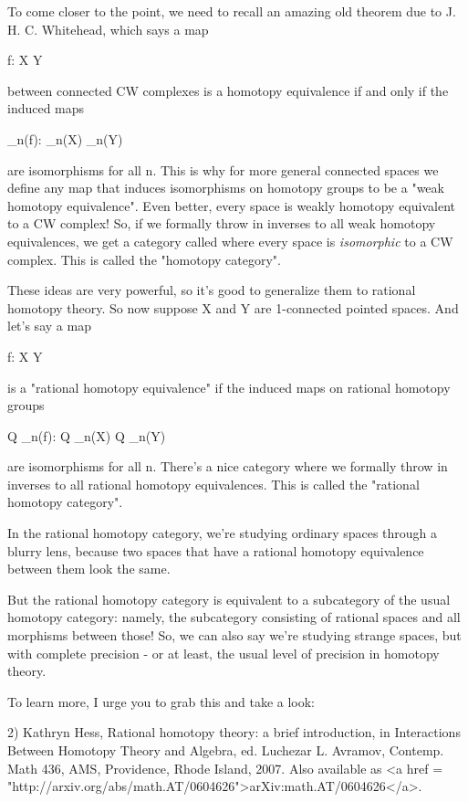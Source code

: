To come closer to the point, we need to recall an amazing old
theorem due to J. H. C. Whitehead, which says a map

f: X \to  Y 

between connected CW complexes is a homotopy equivalence if and only 
if the induced maps

\pi _{n}(f): \pi _{n}(X) \to  \pi _{n}(Y)

are isomorphisms for all n.  This is why for more general connected
spaces we define any map that induces isomorphisms on homotopy groups
to be a "weak homotopy equivalence".  Even better, every space is
weakly homotopy equivalent to a CW complex!  So, if we formally throw
in inverses to all weak homotopy equivalences, we get a category
called where every space is \emph{isomorphic} to a CW complex.  This is
called the "homotopy category".

These ideas are very powerful, so it's good to generalize them to
rational homotopy theory.  So now suppose X and Y are 1-connected
pointed spaces.  And let's say a map

f: X \to  Y

is a "rational homotopy equivalence" if the induced maps
on rational homotopy groups

Q \otimes  \pi _{n}(f): Q \otimes  \pi _{n}(X) \to  Q
\otimes  \pi _{n}(Y)

are isomorphisms for all n.  There's a nice category where we formally
throw in inverses to all rational homotopy equivalences.  This is 
called the "rational homotopy category".  

In the rational homotopy category, we're studying ordinary spaces 
through a blurry lens, because two spaces that have a rational
homotopy equivalence between them look the same.  

But the rational homotopy category is equivalent to a subcategory of
the usual homotopy category: namely, the subcategory consisting of
rational spaces and all morphisms between those!  So, we can also
say we're studying strange spaces, but with complete precision - or
at least, the usual level of precision in homotopy theory.

To learn more, I urge you to grab this and take a look:

2) Kathryn Hess, Rational homotopy theory: a brief introduction,
in Interactions Between Homotopy Theory and Algebra, ed. 
Luchezar L. Avramov, Contemp. Math 436, AMS, Providence, Rhode
Island, 2007.  Also available as <a href = "http://arxiv.org/abs/math.AT/0604626">arXiv:math.AT/0604626</a>.

